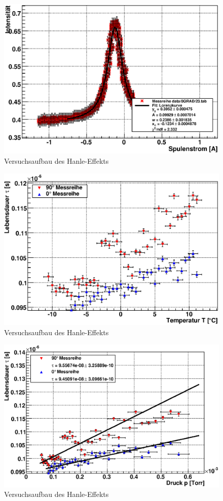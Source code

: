 \documentclass[12pt]{article}
\begin{document}
\begin{figure}[H]  
\centering
\includegraphics[width=0.9\linewidth]{pictures/023eps.eps}
\caption{Versuchsaufbau des Hanle-Effekts}
\end{figure}

\begin{figure}[H]  
\centering
\includegraphics[width=0.9\linewidth]{pictures/lebensdauer_temp.eps}
\caption{Versuchsaufbau des Hanle-Effekts}
\end{figure}

\begin{figure}[H]  
\centering
\includegraphics[width=0.9\linewidth]{pictures/lebensdauer_druck.eps}
\caption{Versuchsaufbau des Hanle-Effekts}
\end{figure}
\end{document}
